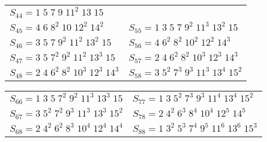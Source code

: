 \documentclass[a4paper,12pt]{report}
\begin{document}
\begin{center}
\begin{tabular}{|l|l|l|}
\end{tabular}


\begin{tabular}{|l|l|}\hline
\hspace{5mm} $S_{44}=1\;5\;7\;9\;11^{2}\;13\;15$ &    \\

\hspace{5mm} $S_{45}=4\;6\;8^{2}\;10\;12^{2}\;14^{2}$ & \hspace{5mm} $S_{55}=1\;3\;5\;7\;9^{2}\;11^{3}\;13^{2}\;15$   \\

\hspace{5mm} $S_{46}=3\;5\;7\;9^{2}\;11^{2}\;13^{2}\;15$ & \hspace{5mm} $S_{56}=4\;6^{2}\;8^{2}\;10^{2}\;12^{2}\;14^{3}$  \\

\hspace{5mm} $S_{47}=3\;5\;7^{2}\;9^{2}\;11^{2}\;13^{3}\;15$ & \hspace{5mm} $S_{57}=2\;4\;6^{2}\;8^{2}\;10^{3}\;12^{3}\;14^{3}$  \\

\hspace{5mm} $S_{48}=2\;4\;6^{2}\;8^{2}\;10^{3}\;12^{3}\;14^{3}$ \hspace{12mm} & \hspace{5mm} $S_{58}=3\;5^{2}\;7^{3}\;9^{3}\;11^{3}\;13^{4}\;15^{2}$ \hspace{12mm} \\

\end{tabular}

\begin{tabular}{|l|l|}\hline
\hspace{5mm} $S_{66}=1\;3\;5\;7^{2}\;9^{2}\;11^{3}\;13^{3}\;15$ & \hspace{5mm} $S_{77}=1\;3\;5^{2}\;7^{3}\;9^{3}\;11^{4}\;13^{4}\;15^{2}$      \\

\hspace{5mm} $S_{67}=3\;5^{2}\;7^{2}\;9^{3}\;11^{3}\;13^{3}\;15^{2}$ & \hspace{5mm} $S_{78}=2\;4^{2}\;6^{3}\;8^{4}\;10^{4}\;12^{5}\;14^{5}$   \\

\hspace{5mm} $S_{68}=2\;4^{2}\;6^{2}\;8^{3}\;10^{4}\;12^{4}\;14^{4}$ \hspace{10mm} & \hspace{5mm}
$S_{88}=1\;3^{2}\;5^{3}\;7^{4}\;9^{5}\;11^{6}\;13^{6}\;15^{3}$ \hspace{7mm} \\ \hline

\end{tabular}

\end{center}
\end{document}
